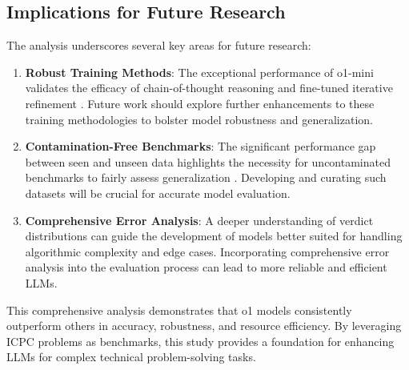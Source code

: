 \subsection{Implications for Future Research}
The analysis underscores several key areas for future research:
\begin{enumerate}
    \item \textbf{Robust Training Methods}: The exceptional performance of o1-mini validates the efficacy of chain-of-thought reasoning and fine-tuned iterative refinement \cite{b4}. Future work should explore further enhancements to these training methodologies to bolster model robustness and generalization.
    \item \textbf{Contamination-Free Benchmarks}: The significant performance gap between seen and unseen data highlights the necessity for uncontaminated benchmarks to fairly assess generalization \cite{b2}. Developing and curating such datasets will be crucial for accurate model evaluation.
    \item \textbf{Comprehensive Error Analysis}: A deeper understanding of verdict distributions can guide the development of models better suited for handling algorithmic complexity and edge cases. Incorporating comprehensive error analysis into the evaluation process can lead to more reliable and efficient LLMs.
\end{enumerate}

This comprehensive analysis demonstrates that o1 models consistently outperform others in accuracy, robustness, and resource efficiency. By leveraging ICPC problems as benchmarks, this study provides a foundation for enhancing LLMs for complex technical problem-solving tasks.
